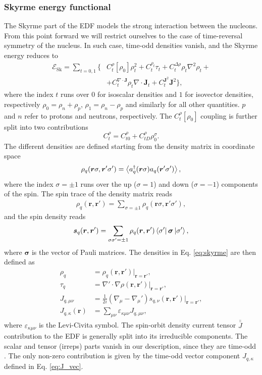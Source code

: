 \documentclass[%
 reprint, linenumbers,
 amsmath,amssymb,
 aps, physrev
]{revtex4-2}
\begin{document}
\subsubsection{\label{sec:e_sk}Skyrme energy functional}
The Skyrme part of the EDF models the strong interaction between the nucleons. From this point forward we will restrict ourselves to the case of time-reversal symmetry of the nucleus. In such case, time-odd densities vanish, and the Skyrme energy reduces to~\cite{unedf, chabanat1, chabanat2}
\begin{eqnarray}
\nonumber
\mathcal E_\text{Sk} = \sum_{t=0,1}\bigg\{&C_t^{\rho}[\rho_0]\rho_t^2 +C_t^{\rho_t}\tau_t + C_t^{\Delta\rho}\rho_t\nabla^2\rho_t+\\\label{eq:skyrme}& +C_t^{\nabla\cdot \boldsymbol{J}}\rho_t\nabla\cdot\boldsymbol{J}_t + C_t^{\boldsymbol{J}^2}\boldsymbol{J}^2\bigg\},
\end{eqnarray}
where the index $t$ runs over $0$ for isoscalar densities and $1$ for isovector densities, respectively $\rho_0 = \rho_n + \rho_p$, $\rho_1 = \rho_n - \rho_p$ and similarly for all other quantities. $p$ and $n$ refer to protons and neutrons, respectively. The $C_t^\rho[\rho_0]$ coupling is further split into two contributions
\begin{equation}
  C_t^{\rho} = C_{t0}^\rho+C_{tD}^\rho \rho_0^\sigma.
\end{equation}
The different densities are defined starting from the density matrix in coordinate space 
\begin{equation}
  \rho_q(\bm r\sigma, \bm r'\sigma') = \expval{a_q^\dagger(\bm r\sigma)a_q(\bm r'\sigma')},
\end{equation}
where the index $\sigma=\pm 1$ runs over the up ($\sigma = 1$) and down ($\sigma = -1$) components of the spin.
The spin trace of the density matrix reads
\begin{align}
  \rho_q(\bm r, \bm r') = \sum_{\sigma =\pm 1}\rho_q(\bm r\sigma, \bm r'\sigma'),
\end{align}
and the spin density reads
\begin{equation}
  \bm s_q (\bm r, \bm r')=\sum_{\sigma\sigma' = \pm 1}\rho_q(\bm r, \bm r')\bra{\sigma'}\bm \sigma \ket{\sigma'},
\end{equation}
where $\bm \sigma$ is the vector of Pauli matrices.
The densities in Eq. \ref{eq:skyrme} are then defined as
\begin{align}
\rho_q &= \rho_q(\bm r, \bm r')|_{\bm r = \bm r'},
\\ \tau_q &= \nabla'\cdot\nabla\rho(\bm r, \bm r')|_{\bm r = \bm r'},
\\J_{q, \mu\nu} &= \frac{1}{2i}(\nabla_\mu - \nabla_\mu') s_{q, \nu}(\bm r, \bm r')|_{\bm r = \bm r'},
\\J_{q,\kappa}(\boldsymbol{r})&=\sum_{\mu\nu}\varepsilon_{\kappa\mu\nu}J_{q,\mu\nu}\label{eq:J_vec},
\end{align}
where $\varepsilon_{\kappa\mu\nu}$ is the Levi-Civita symbol.
The spin-orbit density current tensor $\bar{\bar J}$ contribution to the EDF is generally split into its irreducible components.
The scalar and tensor (irreps) parts vanish in our description, since they are time-odd \cite{conversions}. The only non-zero contribution is given by the time-odd vector component $J_{q,\kappa}$ defined in Eq. \ref{eq:J_vec}.
\end{document}
